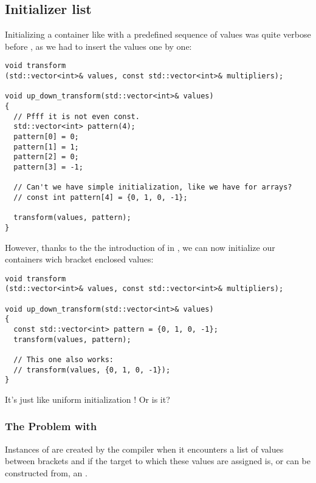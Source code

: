 \subsection{Initializer list}
\label{initializer-list}

\problemtitle

Initializing a container like  with a predefined
sequence of values was quite verbose before , as we had to
insert the values one by one:

\begin{lstlisting}
void transform
(std::vector<int>& values, const std::vector<int>& multipliers);

void up_down_transform(std::vector<int>& values)
{
  // Pfff it is not even const.
  std::vector<int> pattern(4);
  pattern[0] = 0;
  pattern[1] = 1;
  pattern[2] = 0;
  pattern[3] = -1;

  // Can't we have simple initialization, like we have for arrays?
  // const int pattern[4] = {0, 1, 0, -1};

  transform(values, pattern);
}
\end{lstlisting}

\solutiontitle

%
%
However, thanks to the the introduction of
 in , we can now initialize our
containers wich bracket enclosed values:

\begin{lstlisting}
void transform
(std::vector<int>& values, const std::vector<int>& multipliers);

void up_down_transform(std::vector<int>& values)
{
  const std::vector<int> pattern = {0, 1, 0, -1};
  transform(values, pattern);

  // This one also works:
  // transform(values, {0, 1, 0, -1});
}
\end{lstlisting}

It's just like uniform initialization !
Or is it?

\subsubsection{The Problem with }

Instances of  are created by the compiler
when it encounters a list of values between brackets and if the target
to which these values are assigned is, or can be constructed from, an
.

